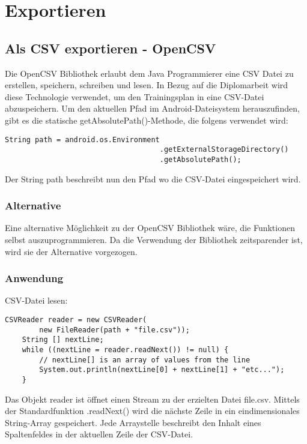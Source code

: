 \documentclass[FIPLY_base.tex]{subfiles}
\begin{document}
\section{Exportieren}
\subsection{Als CSV exportieren - OpenCSV}
Die OpenCSV Bibliothek erlaubt dem Java Programmierer eine CSV Datei zu erstellen, speichern, schreiben und lesen.
In Bezug auf die Diplomarbeit wird diese Technologie verwendet, um den Trainingsplan in eine CSV-Datei abzuspeichern.
Um den aktuellen Pfad im Android-Dateisystem herauszufinden, gibt es die statische getAbsolutePath()-Methode, die folgens verwendet wird:
\begin{lstlisting}[caption={Methode, um den aktuellen Pfad herauszufinden.},label=DescriptiveLabel]
	String path = android.os.Environment
									.getExternalStorageDirectory()
									.getAbsolutePath();
\end{lstlisting}
Der String \grqq{}path\grqq{} beschreibt nun den Pfad wo die CSV-Datei eingespeichert wird.

\subsubsection{Alternative}
Eine alternative Möglichkeit zu der OpenCSV Bibliothek wäre, die Funktionen selbst auszuprogrammieren. Da die Verwendung der Bibliothek zeitsparender ist, wird sie der Alternative vorgezogen.
\subsubsection{Anwendung}
CSV-Datei lesen:
\begin{lstlisting}[caption={Verwendung von CSVReader: Möglichkeit 1, iterativ},label=DescriptiveLabel]
	CSVReader reader = new CSVReader(
		new FileReader(path + "file.csv"));
	String [] nextLine;
	while ((nextLine = reader.readNext()) != null) {
		// nextLine[] is an array of values from the line
		System.out.println(nextLine[0] + nextLine[1] + "etc...");
	}

\end{lstlisting}

Das Objekt reader ist öffnet einen Stream zu der erzielten Datei \grqq{}file.csv\grqq{}. Mittels der Standardfunktion .readNext() wird die nächste Zeile in ein eindimensionales String-Array gespeichert. Jede Arraystelle beschreibt den Inhalt eines Spaltenfeldes in der aktuellen Zeile der CSV-Datei.
\end{document}
